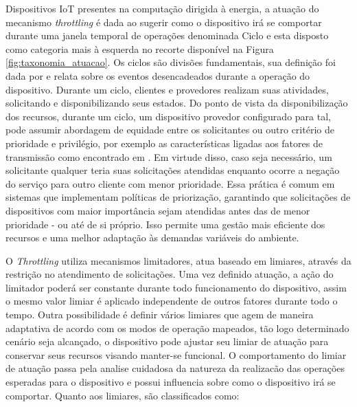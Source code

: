 Dispositivos \acs{IoT} presentes na computação dirigida à energia, a atuação do mecanismo \textit{throttling} é dada ao sugerir como o dispositivo irá se comportar durante uma janela temporal de operações denominada Ciclo e esta disposto como categoria mais à esquerda no recorte disponível na Figura \ref{fig:taxonomia_atuacao}. Os ciclos são divisões fundamentais, sua definição foi dada por  e relata sobre os eventos desencadeados durante a operação do dispositivo. Durante um ciclo, clientes e provedores realizam suas atividades, solicitando e disponibilizando seus estados. Do ponto de vista da disponibilização dos recursos, durante um ciclo, um dispositivo provedor configurado para tal, pode assumir abordagem de equidade entre os solicitantes ou outro critério de prioridade e privilégio, por exemplo as características ligadas aos fatores de transmissão como encontrado em . Em virtude disso, caso seja necessário, um solicitante qualquer teria suas solicitações atendidas enquanto ocorre a negação do serviço para outro cliente com menor prioridade. Essa prática é comum em sistemas que implementam políticas de priorização, garantindo que solicitações de dispositivos com maior importância sejam atendidas antes das de menor prioridade - ou até de si próprio. Isso permite uma gestão mais eficiente dos recursos e uma melhor adaptação às demandas variáveis do ambiente.

O \textit{Throttling} utiliza mecanismos limitadores, atua baseado em limiares, através da restrição no atendimento de solicitações. Uma vez definido atuação, a ação do limitador poderá ser constante durante todo funcionamento do dispositivo, assim o mesmo valor limiar é aplicado independente de outros fatores durante todo o tempo. Outra possibilidade é definir vários limiares que agem de maneira adaptativa de acordo com os modos de operação mapeados, tão logo determinado cenário seja alcançado, o dispositivo pode ajustar seu limiar de atuação para conservar seus recursos visando manter-se funcional. O comportamento do limiar de atuação passa pela analise cuidadosa da natureza da realizacão das operações esperadas para o dispositivo e possui influencia sobre como o dispositivo irá se comportar. Quanto aos limiares, são classificados  como:

